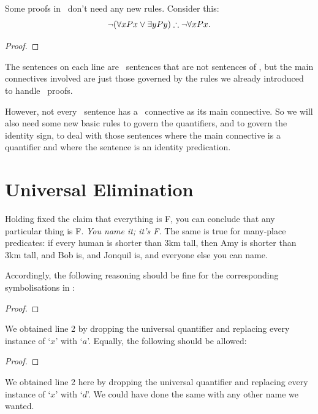 Some proofs in \FOL\ don't need any new rules. Consider this: $$\neg(\forall x Px \vee \exists y Py) \mathrel{\therefore} \neg \forall x Px.$$ \begin{proof}
	\open
	\close
\end{proof} The sentences on each line are \FOL\ sentences that are not sentences of \TFL, but the main connectives involved are just those governed by the rules we already introduced to handle \TFL\ proofs.

However, not every \FOL\ sentence has a \TFL\ connective as its main connective. So we will also need some new basic rules to govern the quantifiers, and to govern the identity sign, to deal with those sentences where the main connective is a quantifier and where the sentence is an identity predication.


\section{Universal Elimination}\label{unielim}

Holding fixed the claim that everything is F, you can conclude that any particular thing is F. \emph{You name it; it's F.} The same is true for many-place predicates: if every human is shorter than 3km tall, then Amy is shorter than 3km tall, and Bob is, and Jonquil is,  and everyone else you can name.

Accordingly, the following reasoning should be fine for the corresponding symbolisations in \FOL:
\begin{proof}
	 
\end{proof}
We obtained line 2 by dropping the universal quantifier and replacing every instance of `$x$' with `$a$'. Equally, the following should be allowed:
\begin{proof}
	 
\end{proof}
We obtained line 2 here by dropping the universal quantifier and replacing every instance of `$x$' with `$d$'. We could have done the same with any other name we wanted. 

